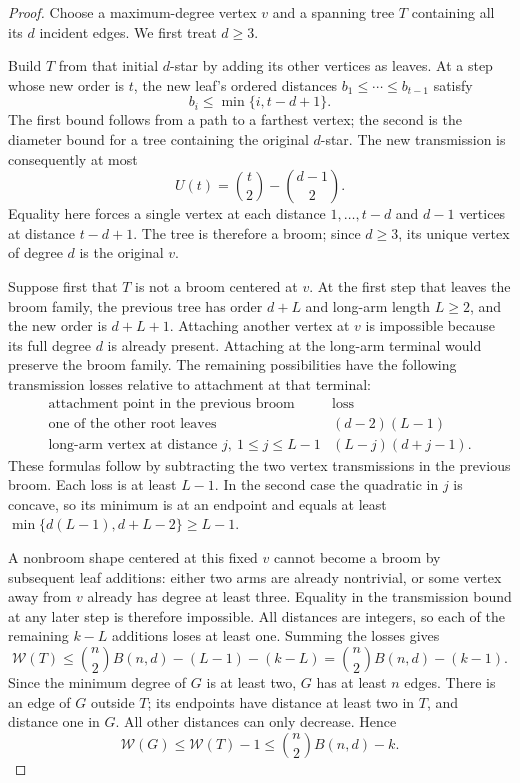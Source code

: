 \documentclass[11pt,a4paper]{article}
\theoremstyle{remark}
\numberwithin{equation}{section}
\begin{document}
\begin{proof}
Choose a maximum-degree vertex \(v\) and a spanning tree \(T\) containing
all its \(d\) incident edges. We first treat \(d\ge3\).

Build \(T\) from that initial \(d\)-star by adding its other vertices as
leaves. At a step whose new order is \(t\), the new leaf's ordered
distances \(b_1\le\cdots\le b_{t-1}\) satisfy
\[
 b_i\le\min\{i,t-d+1\}.
\]
The first bound follows from a path to a farthest vertex; the second is
the diameter bound for a tree containing the original \(d\)-star.
The new transmission is consequently at most
\[
 U(t)=\binom t2-\binom{d-1}{2}.
\]
Equality here forces a single vertex at each distance
\(1,\ldots,t-d\) and \(d-1\) vertices at distance \(t-d+1\).
The tree is therefore a broom; since \(d\ge3\), its unique vertex of
degree \(d\) is the original \(v\).

Suppose first that \(T\) is not a broom centered at \(v\).
At the first step that leaves the broom family, the previous tree has
order \(d+L\) and long-arm length \(L\ge2\), and the new order is
\(d+L+1\). Attaching another vertex at \(v\) is impossible because its
full degree \(d\) is already present. Attaching at the long-arm terminal
would preserve the broom family. The remaining possibilities have the
following transmission losses relative to attachment at that terminal:
\[
 \begin{array}{c|c}
 \text{attachment point in the previous broom}&\text{loss}\\ \hline
 \text{one of the other root leaves}&(d-2)(L-1)\\
 \text{long-arm vertex at distance }j,\ 1\le j\le L-1&
       (L-j)(d+j-1).
 \end{array}
\]
These formulas follow by subtracting the two vertex transmissions in
the previous broom. Each loss is at least \(L-1\). In the second case
the quadratic in \(j\) is concave, so its minimum is at an endpoint and
equals at least
\(\min\{d(L-1),d+L-2\}\ge L-1\).

A nonbroom shape centered at this fixed \(v\) cannot become a broom by
subsequent leaf additions: either two arms are already nontrivial, or
some vertex away from \(v\) already has degree at least three. Equality
in the transmission bound at any later step is therefore impossible.
All distances are integers, so each of the remaining \(k-L\) additions
loses at least one. Summing the losses gives
\[
 \mathcal W(T)\le\binom n2 B(n,d)-(L-1)-(k-L)
 =\binom n2B(n,d)-(k-1).
\]
Since the minimum degree of \(G\) is at least two, \(G\) has at least
\(n\) edges. There is an edge of \(G\) outside \(T\); its endpoints have
distance at least two in \(T\), and distance one in \(G\). All other
distances can only decrease. Hence
\[
 \mathcal W(G)\le\mathcal W(T)-1
 \le\binom n2B(n,d)-k.
\]


\end{proof}
\end{document}
